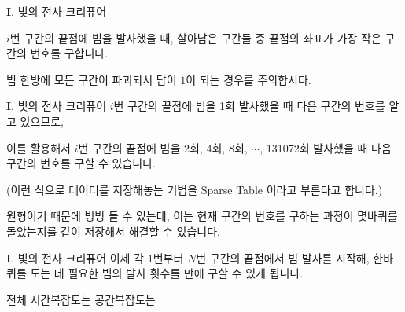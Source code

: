 \begin{frame}{\textbf{I}. 빛의 전사 크리퓨어}
\begin{figure}[h]
%
    \end{figure}
    
    \vspace{14pt}
    
    $i$번 구간의 끝점에 빔을 발사했을 때, 살아남은 구간들 중 끝점의 좌표가 가장 작은 구간의 번호를 구합니다.
    
    빔 한방에 모든 구간이 파괴되서 답이 $1$이 되는 경우를 주의합시다.
    
\end{frame}

\begin{frame}{\textbf{I}. 빛의 전사 크리퓨어}
    $i$번 구간의 끝점에 빔을 1회 발사했을 때 다음 구간의 번호를 알고 있으므로,
    
    \vspace{18pt}

    이를 활용해서 $i$번 구간의 끝점에 빔을 2회, 4회, 8회, $\cdots$, 131072회 발사했을 때 다음 구간의 번호를 구할 수 있습니다.
    
    (이런 식으로 데이터를 저장해놓는 기법을 Sparse Table 이라고 부른다고 합니다.)
    
    \vspace{18pt}

    원형이기 때문에 빙빙 돌 수 있는데, 이는 현재 구간의 번호를 구하는 과정이 몇바퀴를 돌았는지를 같이 저장해서 해결할 수 있습니다.
\end{frame}

\begin{frame}{\textbf{I}. 빛의 전사 크리퓨어}
    이제 각 $1$번부터 $N$번 구간의 끝점에서 빔 발사를 시작해, 한바퀴를 도는 데 필요한 빔의 발사 횟수를 만에 구할 수 있게 됩니다.
    
    \vspace{18pt}
    
    전체 시간복잡도는 공간복잡도는 
\end{frame}



